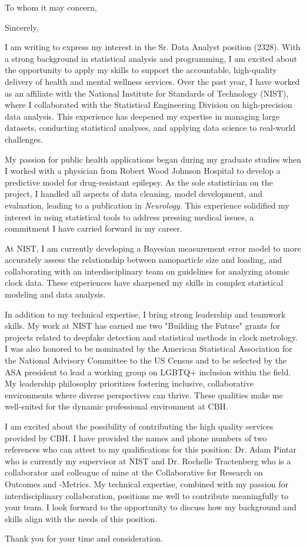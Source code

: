 \documentclass[11pt,a4paper,sans]{moderncv}
\begin{document}
	
	\date{\today }
	\opening{To whom it may concern,}
	\closing{Sincerely,}
	\makelettertitle

I am writing to express my interest in the Sr. Data Analyst position (2328). With a strong background in statistical analysis and programming, I am excited about the opportunity to apply my skills to support the accountable, high-quality delivery of health and mental wellness services. Over the past year, I have worked as an affiliate with the National Institute for Standards of Technology (NIST), where I collaborated with the Statistical Engineering Division on high-precision data analysis. This experience has deepened my expertise in managing large datasets, conducting statistical analyses, and applying data science to real-world challenges.

My passion for public health applications began during my graduate studies when I worked with a physician from Robert Wood Johnson Hospital to develop a predictive model for drug-resistant epilepsy. As the sole statistician on the project, I handled all aspects of data cleaning, model development, and evaluation, leading to a publication in \emph{Neurology}. This experience solidified my interest in using statistical tools to address pressing medical issues, a commitment I have carried forward in my career.

At NIST, I am currently developing a Bayesian measurement error model to more accurately assess the relationship between nanoparticle size and loading, and collaborating with an interdisciplinary team on guidelines for analyzing atomic clock data. These experiences have sharpened my skills in complex statistical modeling and data analysis.

In addition to my technical expertise, I bring strong leadership and teamwork skills. My work at NIST has earned me two "Building the Future" grants for projects related to deepfake detection and statistical methods in clock metrology. I was also honored to be nominated by the American Statistical Association for the National Advisory Committee to the US Census and to be selected by the ASA president to lead a working group on LGBTQ+ inclusion within the field. My leadership philosophy prioritizes fostering inclusive, collaborative environments where diverse perspectives can thrive. These qualities make me well-suited for the dynamic professional environment at CBH.

I am excited about the possibility of contributing the high quality services provided by CBH. I have provided the names and phone numbers of two references who can attest to my qualifications for this position: Dr. Adam Pintar who is currently my supervisor at NIST and Dr. Rochelle Tractenberg who is a collaborator and colleague of mine at the Collaborative for Research on Outcomes and -Metrics. My technical expertise, combined with my passion for interdisciplinary collaboration, positions me well to contribute meaningfully to your team. I look forward to the opportunity to discuss how my background and skills align with the needs of this position.

Thank you for your time and consideration.\\
	
	\vspace{2mm}
	
	\makeletterclosing
	
\end{document}
